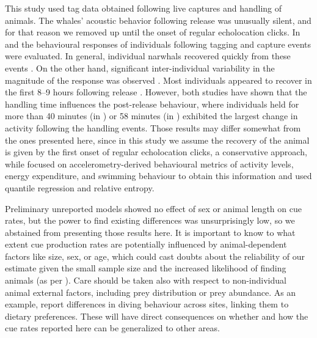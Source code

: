 \documentclass[preprint]{JASA}
\begin{document}
This study used tag data obtained following live captures and handling of animals. The whales’ acoustic behavior following release was unusually  silent, and for that reason we removed  up until the onset of regular echolocation clicks. In \citet{Shuert_2021} and \citet{Nielsen2023} the behavioural responses of individuals following tagging and capture events were evaluated. In general, individual narwhals recovered quickly from these events \citep{Shuert_2021, Nielsen2023}. On the other hand, significant inter-individual variability in the magnitude of the response was observed \citep{Shuert_2021, Nielsen2023}. Most individuals appeared to recover in the first 8--9 hours following release \citep{Shuert_2021, Nielsen2023}. However, both studies have shown that the handling time influences the post-release behaviour, where individuals held for more than 40 minutes (in \citet{Shuert_2021}) or 58 minutes (in \citet{Nielsen2023}) exhibited the largest change in activity following the handling events. Those results may differ somewhat from the ones presented here, since in this study we assume the recovery of the animal is given by the first onset of regular echolocation clicks, a conservative approach, while \citet{Shuert_2021} focused on accelerometry-derived behavioural metrics of activity levels, energy expenditure, and swimming behaviour to obtain this information and  \citet{Nielsen2023} used quantile regression and relative entropy.

Preliminary unreported models showed no effect of sex or animal length on cue rates, but the power to find existing differences was unsurprisingly low, so we abstained from presenting those results here. It is important to know to what extent cue production rates are potentially influenced by animal-dependent factors like size, sex, or age, which could cast doubts about the reliability of our estimate given the small sample size and the increased likelihood of finding animals (as per \citet{Webster2020}). Care should be taken also with respect to non-individual animal  external factors, including prey distribution or prey abundance. As an example, \citet{Watt_2013,Watt_2015} report differences in diving behaviour across sites, linking them to dietary preferences. These will have direct consequences on whether and how the cue rates reported here can be generalized to other areas.
\end{document}
